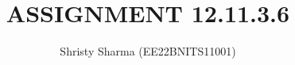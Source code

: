 \documentclass[A4,10pt,twocolumn]{IEEEtran}
\begin{document}
\let\StandardTheFigure\thefigure
\let\vec\mathbf
\renewcommand{\thefigure}{\theproblem}



\def\putbox#1#2#3{\makebox[0in][l]{\makebox[#1][l]{}\raisebox{\baselineskip}[0in][0in]{\raisebox{#2}[0in][0in]{#3}}}}
     \def\rightbox#1{\makebox[0in][r]{#1}}
     \def\centbox#1{\makebox[0in]{#1}}
     \def\topbox#1{\raisebox{-\baselineskip}[0in][0in]{#1}}
     \def\midbox#1{\raisebox{-0.5\baselineskip}[0in][0in]{#1}}



\title{ASSIGNMENT 12.11.3.6}
\author{Shristy Sharma (EE22BNITS11001)}





\maketitle

\newpage


\bigskip

\renewcommand{\thefigure}{\theenumi}
\renewcommand{\thetable}{\theenumi}


%

%
%
\end{document}

